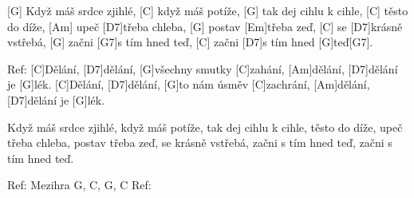 
[G] Když máš srdce zjihlé, [C] když máš potíže, 
[G] tak dej cihlu k cihle, [C] těsto do díže, 
[Am] upeč [D7]třeba chleba, [G] postav [Em]třeba zeď,
[C]  se [D7]krásně vstřebá, 
[G] začni [G7]s tím hned teď, 
[C] začni [D7]s tím hned [G]teď[G7].


Ref: [C]Dělání, [D7]dělání, [G]všechny smutky [C]zahání, 
[Am]dělání, [D7]dělání je [G]lék.
[C]Dělání, [D7]dělání, [G]to nám úsměv [C]zachrání, 
[Am]dělání, [D7]dělání je [G]lék.

Když máš srdce zjihlé, když máš potíže, 
tak dej cihlu k cihle, těsto do díže, 
upeč třeba chleba, postav třeba zeď,
 se krásně vstřebá, začni s tím hned teď, 
začni s tím hned teď.

Ref: 
Mezihra G, C, G, C
Ref: 